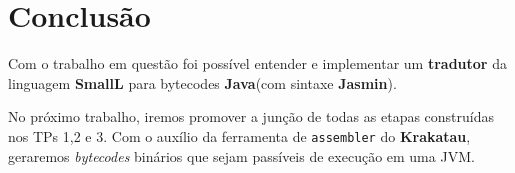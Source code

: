 \section{Conclusão}

Com o trabalho em questão foi possível entender e implementar um \textbf{tradutor} da linguagem \textbf{SmallL} para bytecodes \textbf{Java}(com sintaxe \textbf{Jasmin}).

No próximo trabalho, iremos promover a junção de todas as etapas construídas nos TPs 1,2 e 3. Com o auxílio da ferramenta de \texttt{assembler} do \textbf{Krakatau}, geraremos \textit{bytecodes} binários que sejam passíveis de execução em uma JVM.
